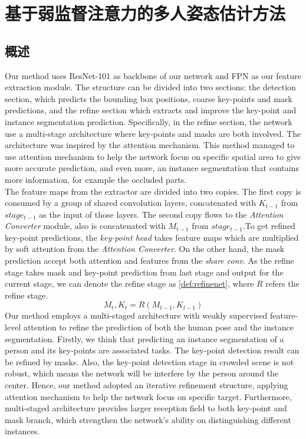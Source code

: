 \chapter{基于弱监督注意力的多人姿态估计方法}
\label{cha:method}

\section{概述}
\label{sec:methodoverview}
Our method uses ResNet-101 as backbone of our network and FPN as our feature extraction module. The structure can be divided into two sections: the detection section, which predicts the bounding box positions, coarse key-points and mask predictions, and the refine section which extracts and improve the key-point and instance segmentation prediction. Specifically, in the refine section, the network use a multi-stage architecture where key-points and masks are both involved. The architecture was inspired by the attention mechanism. This method managed to use attention mechanism to help the network focus on specific spatial area to give more accurate prediction, and even more, an instance segmentation that contains more information, for example the occluded parts.\\
The feature maps from the extractor are divided into two copies. The first copy is consumed by a group of shared convolution layers, concatenated with $K_{t-1}$ from $stage_{t-1}$ as the input of those layers. The second copy flows to the \textit{Attention Converter} module, also is concatenated with $M_{t-1}$ from $stage_{t-1}$.To get refined key-point predictions, the \textit{key-point head} takes feature maps which are multiplied by soft attention from the \textit{Attention Converter}. On the other hand, the mask prediction accept both attention and features from the \textit{share conv}. As the refine stage takes mask and key-point prediction from last stage and output for the current stage, we can denote the refine stage as \eqref{def:refinenet}, where $R$ refers the refine stage.
\begin{equation}
\label{def:refinenet}
M_t, K_t = R(M_{t-1}, K_{t-1})
\end{equation}
Our method employs a multi-staged architecture with weakly supervised feature-level attention to refine the prediction of both the human pose and the instance segmentation. Firstly, we think that predicting an instance segmentation of a person and its key-points are associated tasks. The key-point detection result can be refined by masks. Also, the key-point detection stage in crowded scene is not robust, which means the network will be interfere by the person around the center. Hence, our method adopted an iterative refinement structure, applying attention mechanism to help the network focus on specific target. Furthermore, multi-staged architecture provides larger reception field to both key-point and mask branch, which strengthen the network's ability on distinguishing different instances.

